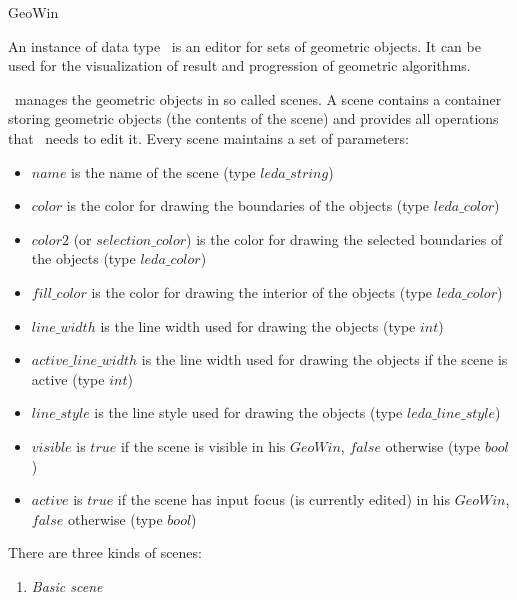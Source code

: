 \ccDefGlobalScope{}
\begin{ccRefClass}{GeoWin}



\ccDefinition
{}

    An instance of data type \ccRefName\ is an editor 
    for sets of geometric objects. It can be used for the visualization of result
    and progression of geometric algorithms.
    
    \ccRefName\ manages the geometric objects in so called scenes.
    A scene contains a container storing geometric objects (the contents of the
    scene) and provides all operations that \ccRefName\ needs to edit it. 
    Every scene maintains a set of parameters:
    
    \begin{itemize}
    \item $name$ is the name of the scene 
          (type $leda\_string$)
    \item $color$ is the color for drawing the boundaries of the objects
          (type $leda\_color$)
    \item $color2$ (or $selection\_color$) is the color for drawing the selected boundaries of the objects
          (type $leda\_color$)
    \item $fill\_color$ is the color for drawing the interior of the objects
          (type $leda\_color$)
    \item $line\_width$ is the line width used for drawing the objects
          (type $int$)
    \item $active\_line\_width$ is the line width used for drawing the objects if the
          scene is active (type $int$)
    \item $line\_style$ is the line style used for drawing the objects
          (type $leda\_line\_style$)
    \item $visible$ is $true$ if the scene is visible in his $GeoWin$, $false$ otherwise
          (type $bool$)
    \item $active$ is $true$ if the scene has input focus (is currently edited) in
          his $GeoWin$, $false$ otherwise (type $bool$)
    \end{itemize}
    
    There are three kinds of scenes:
    \begin{enumerate}
    
    \item {\em Basic scene}
    

\end{enumerate}
\end{ccRefClass}
